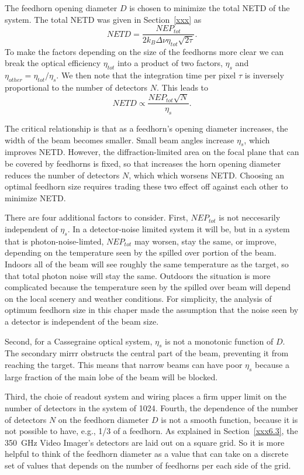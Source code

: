 \documentclass[10pt,twocolumn,article]{memoir}
\newcommand*{\sectionref}[1]{Section~\ref{#1}}
\newcommand*{\NETD}{{\small NETD}\xspace}
\newcommand*{\Imager}{350~GHz Video Imager\xspace}
\begin{document}
The feedhorn opening diameter $D$ is chosen to minimize the total \NETD of the system.
The total \NETD was given in \sectionref{xxx} as
\[
    NETD = \frac{NEP_{tot}}{2 k_B \Delta \nu \eta_{tot} \sqrt{2 \tau}}.
\]
To make the factors depending on the size of the feedhorns more clear we can break the optical efficiency $\eta_{tot}$ into a product of two factors, $\eta_s$ and $\eta_{other} = \eta_{tot} / \eta_s$.
We then note that the integration time per pixel $\tau$ is inversely proportional to the number of detectors $N$.
This leads to
\[
    NETD \propto \frac{NEP_{tot}\sqrt{N}}{\eta_s}.
\]

The critical relationship is that as a feedhorn's opening diameter increases, the width of the beam becomes smaller.
Small beam angles increase $\eta_s$, which improves \NETD.
However, the diffraction-limited area on the focal plane that can be covered by feedhorns is fixed, so that increases the horn opening diameter reduces the number of detectors $N$, which which worsens \NETD.
Choosing an optimal feedhorn size requires trading these two effect off against each other to minimize \NETD.

There are four additional factors to consider.
First, $NEP_{tot}$ is not neccesarily independent of $\eta_s$.
In a detector-noise limited system it will be, but in a system that is photon-noise-limted, $NEP_{tot}$ may worsen, stay the same, or improve, depending on the temperature seen by the spilled over portion of the beam.
Indoors all of the beam will see roughly the same temperature as the target, so that total photon noise will stay the same.
Outdoors the situation is more complicated because the temperature seen by the spilled over beam will depend on the local scenery and weather conditions.
For simplicity, the analysis of optimum feedhorn size in this chaper made the assumption that the noise seen by a detector is independent of the beam size.

Second, for a Cassegraine optical system, $\eta_s$ is not a monotonic function of $D$.
The secondary mirrr obstructs the central part of the beam, preventing it from reaching the target.
This means that narrow beams can have poor $\eta_s$ because a large fraction of the main lobe of the beam will be blocked.

Third, the choie of readout system and wiring places a firm upper limit on the number of detectors in the system of 1024.
Fourth, the dependence of the number of detectors $N$ on the feedhorn diameter $D$ is not a smooth function, because it is not possible to have, e.g., 1/3 of a feedhorn.
As explained in \sectionref{xxx6.3}, the \Imager's detectors are laid out on a square grid.
So it is more helpful to think of the feedhorn diameter as a value that can take on a discrete set of values that depends on the number of feedhorns per each side of the grid.
\end{document}
